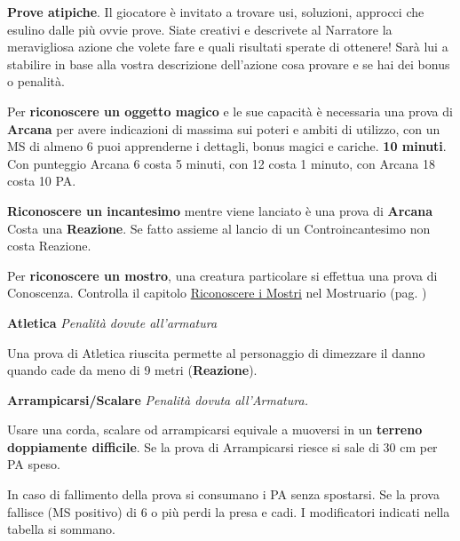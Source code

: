 \documentclass[12pt,a4paper,twoside,openany]{book}
\begin{document}
\begin{multicols}{2}
\textbf{Prove atipiche}. Il giocatore è invitato a trovare usi, soluzioni, approcci che esulino dalle più ovvie prove. Siate creativi e descrivete al Narratore la meravigliosa azione che volete fare e quali risultati sperate di ottenere! Sarà lui a stabilire in base alla vostra descrizione dell'azione cosa provare e se hai dei bonus o penalità.

\medskip

Per \textbf{riconoscere un oggetto magico} e le sue capacità è necessaria una prova di \textbf{Arcana} per avere indicazioni di massima sui poteri e ambiti di utilizzo, con un MS di almeno 6 puoi apprenderne i dettagli, bonus magici e cariche. \textbf{10 minuti}. Con punteggio Arcana 6 costa 5 minuti, con 12 costa 1 minuto, con Arcana 18 costa 10 PA.

\medskip

\textbf{Riconoscere un incantesimo} mentre viene lanciato è una prova di \textbf{Arcana} Costa una \textbf{Reazione}. Se fatto assieme al lancio di un Controincantesimo non costa Reazione.

\medskip

Per \textbf{riconoscere un mostro}, una creatura particolare si effettua una prova di Conoscenza. Controlla il capitolo \hyperlink{riconoscereimostri}{Riconoscere i Mostri} nel Mostruario (pag. \pageref{riconoscereimostri})

\medskip

\textbf{Atletica} \textit{Penalità dovute all'armatura}

Una prova di Atletica riuscita permette al personaggio di dimezzare il danno quando cade da meno di 9 metri (\textbf{Reazione}).

\medskip

\textbf{Arrampicarsi/Scalare}  \textit{Penalità dovuta all'Armatura.}

\medskip

Usare una corda, scalare od arrampicarsi equivale a muoversi in un \textbf{terreno doppiamente difficile}. Se la prova di Arrampicarsi riesce si sale di 30 cm per PA speso.

In caso di fallimento della prova si consumano i PA senza spostarsi. Se la prova fallisce (MS positivo) di 6 o più perdi la presa e cadi. I modificatori indicati nella tabella si sommano.\\


\end{multicols}
\end{document}
